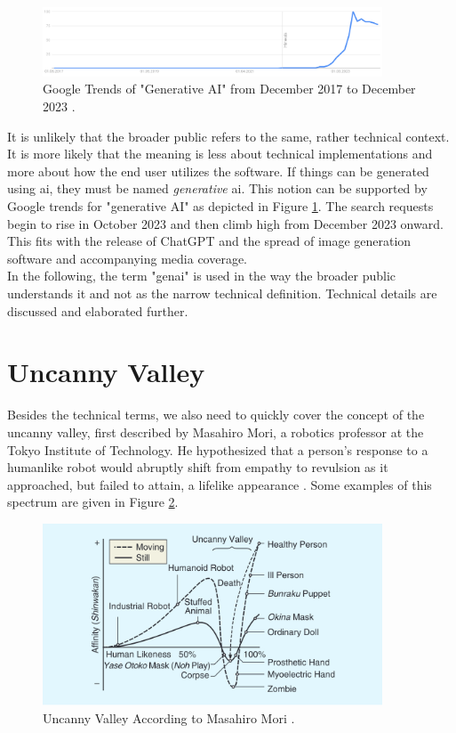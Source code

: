 \documentclass[
  a4paper,  %
  twoside,  %
  bibliography=totoc,
  headsepline,
  cleardoublepage=empty,
  parskip=half,
  draft=false
]{scrbook}
\begin{document}
\begin{figure}[h]
  \centering
  \includegraphics[width=0.9\textwidth]{./graphics/gtrends_genAI_1712-2312.png}
  \caption{Google Trends of "Generative AI" from December 2017 to December 2023 \cite{googletrendsGoogleTrendsQuery}.}
  \label{fig:gtrend-genai}
\end{figure}

It is unlikely that the broader public refers to the same, rather technical context. It is more likely that the meaning is less about technical implementations and more about how the end user utilizes the software. If things can be generated using \gls{ai}, they must be named \textit{generative} \gls{ai}. This notion can be supported by Google trends for "generative AI" as depicted in Figure \ref{fig:gtrend-genai}. The search requests begin to rise in October 2023 and then climb high from December 2023 onward. This fits with the release of ChatGPT and the spread of image generation software and accompanying media coverage. \\
In the following, the term "\gls{genai}" is used in the way the broader public understands it and not as the narrow technical definition. Technical details are discussed and elaborated further. 

\section{Uncanny Valley}
Besides the technical terms, we also need to quickly cover the concept of the uncanny valley, first described by Masahiro Mori, a robotics professor at the Tokyo Institute of Technology. He hypothesized that a person's response to a humanlike robot would abruptly shift from empathy to revulsion as it approached, but failed to attain, a lifelike appearance \cite{moriUncannyValleyField2012}. Some examples of this spectrum are given in Figure \ref{fig:uncanny-valley}.

\begin{figure}[h]
  \centering
  \includegraphics[width=0.9\textwidth]{./graphics/uncanny-valley.png}
  \caption{Uncanny Valley According to Masahiro Mori \cite{moriUncannyValleyField2012}.}
  \label{fig:uncanny-valley}
\end{figure}
\end{document}
